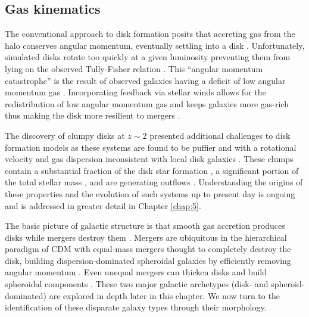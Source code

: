 \subsection{Gas kinematics}
\label{sec: gas kinematics}

The conventional approach to disk formation posits that accreting gas from the halo conserves angular momentum, eventually settling into a disk \citep{Fall1980,Mo1998}. Unfortunately, simulated disks rotate too quickly at a given luminosity preventing them from lying on the observed Tully-Fisher relation \citep[e.g, review by][]{Brooks2010}. This ``angular momentum catastrophe'' is the result of observed galaxies having a deficit of low angular momentum gas \citep{Bullock2001,vandenBosch2001}. Incorporating feedback via stellar winds allows for the redistribution of low angular momentum gas and keeps galaxies more gas-rich thus making the disk more resilient to mergers \citep{Governato2009,Robertson2006,Brook2012}. 

The discovery of clumpy disks at $z\sim2$ \citep{Elmegreen2005} presented additional challenges to disk formation models as these systems are found to be puffier and with a rotational velocity and gas dispersion inconsistent with local disk galaxies \citep{ForsterSchreiber2009}. These clumps contain a substantial fraction of the disk star formation \citep{Guo2012}, a significant portion of the total stellar mass \citep{WuFoSch2012}, and are generating outflows \citep{Genzel2011}. Understanding the origins of these properties and the evolution of such systems up to present day is ongoing and is addressed in greater detail in Chapter \ref{chap:5}. 


The basic picture of galactic structure is that smooth gas accretion produces disks while mergers destroy them \citep{Toomre1977}. Mergers are ubiquitous in the hierarchical paradigm of CDM with equal-mass mergers thought to completely destroy the disk, building dispersion-dominated spheroidal galaxies by efficiently removing angular momentum \citep{Barnes1992,Mihos1996}. Even unequal mergers can thicken disks and build spheroidal components \citep{Moster2010}. These two major galactic archetypes (disk- and spheroid-dominated) are explored in depth later in this chapter. We now turn to the identification of these disparate galaxy types through their morphology.




